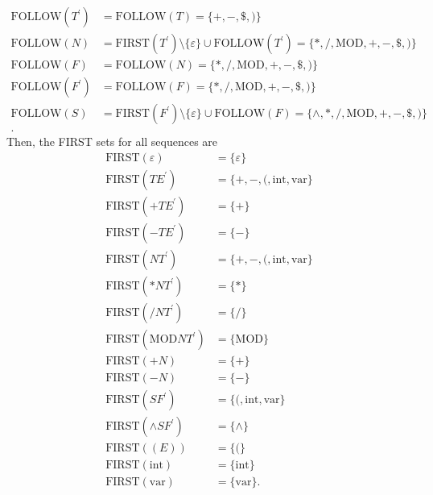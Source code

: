 \documentclass{report}
\begin{document}
\begin{itemize}
\begin{align*}
                \text{FOLLOW}(T^{\prime}) &= \text{FOLLOW}(T) = \{+,-,\$,)\}\\
                \text{FOLLOW}(N) &= \text{FIRST}(T^{\prime}) \setminus \{\varepsilon\} \cup \text{FOLLOW}(T^{\prime}) = \{*, /, \text{MOD}, +, -, \$, )\}\\
                \text{FOLLOW}(F) &= \text{FOLLOW}(N) = \{*, /, \text{MOD}, +, -, \$, )\}\\
                \text{FOLLOW}(F^{\prime}) &= \text{FOLLOW}(F) = \{*, /, \text{MOD}, +, -, \$, )\}\\
                \text{FOLLOW}(S) &= \text{FIRST}(F^{\prime}) \setminus \{\varepsilon\} \cup \text{FOLLOW}(F) = \{\land, *, /, \text{MOD}, +, -, \$, )\}\\
            .\end{align*}
            Then, the FIRST sets for all sequences are 
            \begin{align*}
                \text{FIRST}(\varepsilon) &= \{\varepsilon\}\\
                \text{FIRST}(TE^{\prime}) &= \{+,-,(, \text{int}, \text{var}\}\\
                \text{FIRST}(+TE^{\prime}) &= \{+\}\\
                \text{FIRST}(-TE^{\prime}) &= \{-\}\\
                \text{FIRST}(NT^{\prime}) &= \{+,-,(, \text{int}, \text{var}\}\\
                \text{FIRST}(*NT^{\prime}) &= \{*\}\\
                \text{FIRST}(/NT^{\prime}) &= \{/\}\\
                \text{FIRST}(\text{MOD}NT^{\prime}) &= \{\text{MOD}\}\\
                \text{FIRST}(+N) &= \{+\}\\
                \text{FIRST}(-N) &= \{-\} \\
                \text{FIRST}(SF^{\prime}) &= \{(, \text{int}, \text{var}\}\\
                \text{FIRST}(\land SF^{\prime}) &= \{\land\}\\
                \text{FIRST}((E)) &= \{(\}\\
                \text{FIRST}(\text{int}) &= \{\text{int}\}\\
                \text{FIRST}(\text{var}) &= \{\text{var}\}
            .\end{align*}


\end{itemize}
\end{document}
